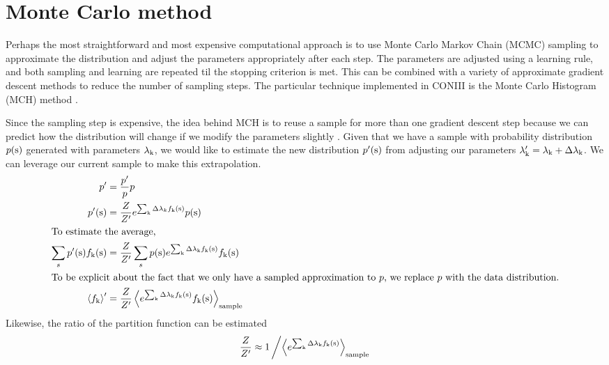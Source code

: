 \documentclass[aps,prl,twocolumn,nofootinbib]{revtex4-1}
\begin{document}
\section{Monte Carlo method}
Perhaps the most straightforward and most expensive computational approach is to use Monte Carlo Markov Chain (MCMC) sampling to approximate the distribution and adjust the parameters appropriately after each step. The parameters are adjusted using a learning rule, and both sampling and learning are repeated til the stopping criterion is met.
This can be combined with a variety of approximate gradient descent methods to reduce the number of sampling steps. The particular technique implemented in CONIII is the Monte Carlo Histogram (MCH) method \cite{Broderick:2007wq}.

Since the sampling step is expensive, the idea behind MCH is to reuse a sample for more than one gradient descent step because we can predict how the distribution will change if we modify the parameters slightly \cite{Broderick:2007wq}. Given that we have a sample with probability distribution $p({\rm s})$ generated with parameters $\lambda_{\rm k}$, we would like to estimate the new distribution $p'({\rm s})$ from adjusting our parameters $\lambda_{\rm k}' = \lambda_{\rm k}+\Delta\lambda_{\rm k}$. We can leverage our current sample to make this extrapolation.
\begin{align}
	p' &= \frac{p'}{p}p\\
	p'({\rm s})	&= \frac{Z}{Z'}e^{\sum_{\rm k} \Delta\lambda_k f_{\rm k}({\rm s})} p({\rm s})\\
\intertext{To estimate the average,}
	\sum_s p'({\rm s}) f_{\rm k}({\rm s}) &= \frac{Z}{Z'} \sum_s p({\rm s}) e^{\sum_{\rm k} \Delta\lambda_{\rm k} f_{\rm k}({\rm s})} f_{\rm k}({\rm s})\\
\intertext{To be explicit about the fact that we only have a sampled approximation to $p$, we replace $p$ with the data distribution.}
	\left<f_{\rm k}\right>' &= \frac{Z}{Z'} \left<e^{\sum_{\rm k} \Delta\lambda_{\rm k} f_{\rm k}({\rm s})} f_{\rm k}({\rm s})\right>_{\rm sample}
\end{align}
Likewise, the ratio of the partition function can be estimated
\begin{align}
	\frac{Z}{Z'} \approx 1\left/\left<e^{\sum_{\rm k} \Delta\lambda_{\rm k} f_{\rm k}({\rm s})}\right>_{\rm sample}\right.
\end{align}
\end{document}

